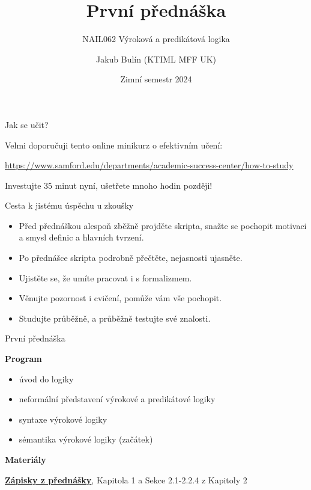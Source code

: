 \documentclass{beamer}
\title{První přednáška}
\subtitle{NAIL062 Výroková a predikátová logika}
\author{Jakub Bulín (KTIML MFF UK)}
\date{Zimní semestr 2024}
\begin{document}
\maketitle


\begin{frame}{Jak se učit?}

    Velmi doporučuji tento online minikurz o efektivním učení:


    \href{https://www.samford.edu/departments/academic-success-center/how-to-study}{\alert{https://www.samford.edu/departments/academic-success-center/how-to-study}}

    Investujte 35 minut nyní, ušetřete mnoho hodin později!
    
\end{frame}


\begin{frame}{Cesta k jistému úspěchu u zkoušky}

    \begin{itemize}    
        \item \alert{Před přednáškou} alespoň zběžně projděte skripta, snažte se pochopit motivaci a smysl definic a hlavních tvrzení.
        \item Po přednášce skripta \alert{podrobně přečtěte}, nejasnosti ujasněte.
        \item Ujistěte se, že umíte pracovat i s \alert{formalizmem}.
        \item Věnujte pozornost i \alert{cvičení}, pomůže vám vše pochopit.
        \item Studujte \alert{průběžně}, a průběžně \alert{testujte své znalosti}.
    \end{itemize}

\end{frame}


\begin{frame}{První přednáška}

    \textbf{Program}
        \begin{itemize}
            \item úvod do logiky
            \item neformální představení výrokové a predikátové logiky
            \item syntaxe výrokové logiky
            \item sémantika výrokové logiky (začátek)
        \end{itemize}

    \textbf{Materiály}

        \href{https://github.com/jbulin-mff-uk/nail062/raw/main/lecture/lecture-notes/lecture-notes.pdf}{\alert{\textbf{Zápisky z přednášky}}}, Kapitola 1 a Sekce 2.1-2.2.4 z Kapitoly 2

\end{frame}
\end{document}
